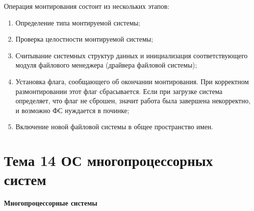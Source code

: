 \begin{utv}
  Операция монтирования состоит из нескольких этапов:
  \begin{enumerate}
    \item Определение типа монтируемой системы;
    \item Проверка целостности монтируемой системы;
    \item Считывание системных структур данных и инициализация соответствующего модуля файлового менеджера (драйвера файловой системы);
    \item Установка флага, сообщающего об окончании монтирования. При корректном размонтировании этот флаг сбрасывается. Если при загрузке система определяет, что флаг не сброшен, значит работа была завершена некорректно, и возможно ФС нуждается в починке;
    \item Включение новой файловой системы в общее пространство имен.
  \end{enumerate}
\end{utv}

\newpage 
\chapter{Тема 14 ОС многопроцессорных систем}

\begin{center}{\bfseries Многопроцессорные системы}
\end{center}

